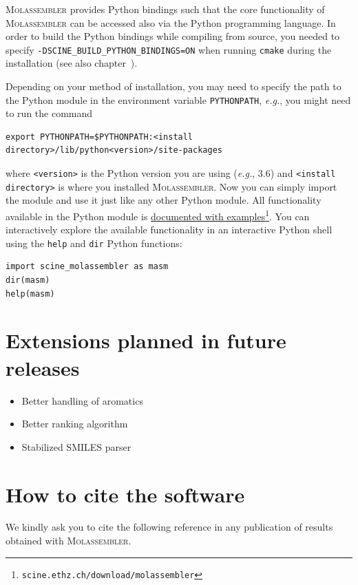 \documentclass[]{tufte-book}
\begin{document}
\textsc{Molassembler} provides Python bindings such that the core functionality
of \textsc{Molassembler} can be accessed also via the Python programming
language. In order to build the Python bindings while compiling from source, you
needed to specify \texttt{-DSCINE\_BUILD\_PYTHON\_BINDINGS=ON} when running
\texttt{cmake} during the installation (see also
chapter~).

Depending on your method of installation, you may need to specify the path to
the Python module in the environment variable \texttt{PYTHONPATH},
\textit{e.g.}, you might need to run the command 

\begin{Verbatim} 
export PYTHONPATH=$PYTHONPATH:<install directory>/lib/python<version>/site-packages 
\end{Verbatim} 

where \texttt{<version>} is the Python version you are using (\textit{e.g.},
3.6) and \texttt{<install directory>} is where you installed
\textsc{Molassembler}. Now you can simply import the module and use it just
like any other Python module. All functionality available in the Python module
is
\href{https://scine.ethz.ch/static/download/documentation/molassembler/v3.0.1/py}{documented with
examples}\footnote{\texttt{scine.ethz.ch/download/molassembler}}. You can
interactively explore the available functionality in an interactive Python shell
using the \texttt{help} and \texttt{dir} Python functions:

\begin{Verbatim}
import scine_molassembler as masm
dir(masm)
help(masm)
\end{Verbatim}

\chapter{Extensions planned in future releases}
\begin{itemize}
  \item Better handling of aromatics
  \item Better ranking algorithm
  \item Stabilized SMILES parser
\end{itemize}


\chapter{How to cite the software}

We kindly ask you to cite the following reference in any publication of results
obtained with \textsc{Molassembler}.
\end{document}
